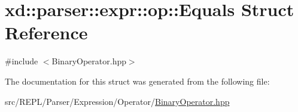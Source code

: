 \hypertarget{structxd_1_1parser_1_1expr_1_1op_1_1_equals}{}\section{xd\+:\+:parser\+:\+:expr\+:\+:op\+:\+:Equals Struct Reference}
\label{structxd_1_1parser_1_1expr_1_1op_1_1_equals}


{\ttfamily \#include $<$Binary\+Operator.\+hpp$>$}



The documentation for this struct was generated from the following file\+:\begin{DoxyCompactItemize}
\item 
src/\+R\+E\+P\+L/\+Parser/\+Expression/\+Operator/\mbox{\hyperlink{_binary_operator_8hpp}{Binary\+Operator.\+hpp}}\end{DoxyCompactItemize}
